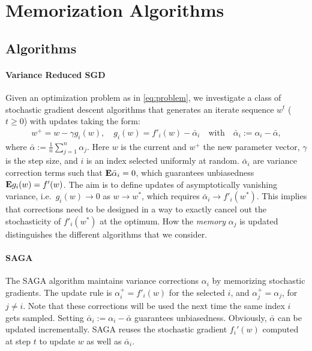 %

\section{Memorization Algorithms}
\label{sect:memorization}

\subsection{Algorithms} 

\paragraph*{Variance Reduced SGD}

Given an optimization problem as in \eqref{eq:problem}, we investigate a class of stochastic gradient descent algorithms that generates an iterate sequence $w^t$ ($t \ge 0$) with updates taking the  form:
\begin{align}
w^+ = w - \gamma g_i(w),  \quad g_i(w)=  f'_i(w) - \bar \alpha_i \quad \text{with} \quad  \bar{\alpha}_i := \alpha_i - \bar{\alpha},
\label{eq:sgd-corrected}
\end{align}
where $\bar{\alpha} := \frac 1n \sum_{j=1}^n \alpha_j$.
Here $w$ is the current and $w^+$ the new parameter vector, $\gamma$ is the  step size,  and $i$ is an index selected uniformly at random. $\bar\alpha_i$ are variance correction terms such that  ${\mathbf E} \bar\alpha_i = 0$, which guarantees unbiasedness ${\mathbf E} g_i(w) =f'(w)$. The aim is to define updates of asymptotically vanishing variance, i.e.~$g_i(w) \to 0$ as $w \to w^*$, which  requires  $\bar\alpha_i \to f'_i(w^*)$. This implies that corrections need to be designed in a way to exactly cancel out the stochasticity of $f'_i(w^*)$ at the optimum. How the \emph{memory} $\alpha_j$ is updated distinguishes the different algorithms that we consider. 

\paragraph*{SAGA}

The SAGA algorithm \cite{defazio2014} maintains variance corrections $\alpha_i$  by memorizing stochastic gradients. The update rule is $\alpha^+_i  = f'_i(w)$ for the selected $i$, and $\alpha_j^+= \alpha_j$, for $j \neq i$. Note that these corrections will be used the next time the same index $i$ gets sampled.  Setting $\bar\alpha_i := \alpha_i - \bar \alpha$ guarantees unbiasedness. Obviously, $\bar \alpha$ can be updated incrementally. SAGA reuses the stochastic gradient $f_i'(w)$ computed at step $t$ to update $w$ as well as $\bar \alpha_i$.

